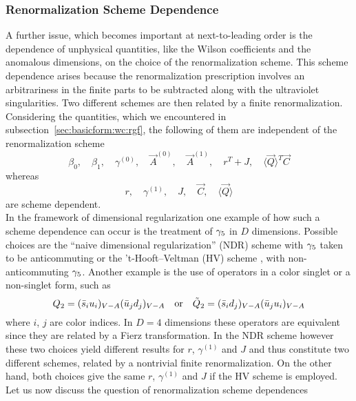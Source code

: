 \subsubsection{Renormalization Scheme Dependence}
               \label{sec:basicform:wc:rgdep}
A further issue, which becomes important at next-to-leading order is
the dependence of unphysical quantities, like the Wilson coefficients
and the anomalous dimensions, on the choice of the renormalization
scheme. This scheme dependence arises because the renormalization
prescription involves an arbitrariness in the finite parts to be
subtracted along with the ultraviolet singularities.  Two different
schemes are then related by a finite renormalization.  Considering the
quantities, which we encountered in
subsection~\ref{sec:basicform:wc:rgf}, the following of them are
independent of the renormalization scheme
\begin{equation}\label{rsi}
\beta_0,\quad\beta_1,\quad\gamma^{(0)},\quad\vec A^{(0)},\quad
\vec A^{(1)},\quad r^T+J,\quad\langle\vec Q\rangle^T\vec C  \end{equation}
whereas
\begin{equation}\label{rsd}
r,\quad\gamma^{(1)},\quad J,\quad\vec C,\quad\langle\vec Q\rangle \end{equation}
are scheme dependent.\\
In the framework of dimensional regularization one example of how
such a scheme dependence can occur is the treatment of $\gamma_5$ in $D$
dimensions.
Possible choices are the ``naive dimensional regularization'' (NDR)
scheme with $\gamma_5$ taken to be
anticommuting or the 't-Hooft--Veltman (HV) scheme
\cite{thooft:72}, \cite{breitenlohner:77} with
non-anticommuting $\gamma_5$. Another example is the use of operators in
a color singlet or a non-singlet form, such as
\begin{equation}\label{qtwi}
Q_2=(\bar s_iu_i)_{V-A}(\bar u_jd_j)_{V-A}
\quad \hbox{\rm or}\quad
\tilde Q_2=(\bar s_id_j)_{V-A}(\bar u_ju_i)_{V-A} \end{equation}
where $i$, $j$ are color indices. In $D=4$ dimensions these operators
are equivalent since they are related by a Fierz transformation. In
the NDR scheme however these two choices yield different results
for $r$, $\gamma^{(1)}$ and $J$ and thus constitute two different
schemes, related by a nontrivial finite renormalization. On the
other hand, both choices give the same $r$, $\gamma^{(1)}$ and $J$
if the HV scheme is employed.\\
Let us now discuss the question of renormalization scheme dependences
